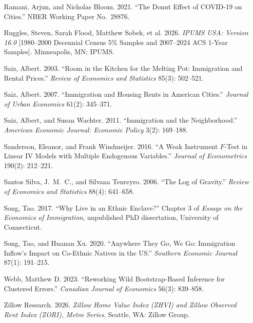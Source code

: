 \documentclass[11pt]{article}
\begin{document}
\begin{list}{}{%
  \setlength{\leftmargin}{1.5em}%
  \setlength{\itemindent}{-1.5em}%
  \setlength{\itemsep}{0.14em}%
  \setlength{\parsep}{0pt}%
}
\item Ramani, Arjun, and Nicholas Bloom. 2021. ``The Donut Effect of COVID-19 on Cities.'' NBER Working Paper No.\ 28876.
\item Ruggles, Steven, Sarah Flood, Matthew Sobek, et al. 2026. \emph{IPUMS USA: Version 16.0} [1980--2000 Decennial Census 5\% Samples and 2007--2024 ACS 1-Year Samples]. Minneapolis, MN: IPUMS.
\item Saiz, Albert. 2003. ``Room in the Kitchen for the Melting Pot: Immigration and Rental Prices.'' \emph{Review of Economics and Statistics} 85(3): 502--521.
\item Saiz, Albert. 2007. ``Immigration and Housing Rents in American Cities.'' \emph{Journal of Urban Economics} 61(2): 345--371.
\item Saiz, Albert, and Susan Wachter. 2011. ``Immigration and the Neighborhood.'' \emph{American Economic Journal: Economic Policy} 3(2): 169--188.
\item Sanderson, Eleanor, and Frank Windmeijer. 2016. ``A Weak Instrument $F$-Test in Linear IV Models with Multiple Endogenous Variables.'' \emph{Journal of Econometrics} 190(2): 212--221.
\item Santos Silva, J.\ M.\ C., and Silvana Tenreyro. 2006. ``The Log of Gravity.'' \emph{Review of Economics and Statistics} 88(4): 641--658.
\item Song, Tao. 2017. ``Why Live in an Ethnic Enclave?'' Chapter 3 of \emph{Essays on the Economics of Immigration}, unpublished PhD dissertation, University of Connecticut.
\item Song, Tao, and Huanan Xu. 2020. ``Anywhere They Go, We Go: Immigration Inflow's Impact on Co-Ethnic Natives in the US.'' \emph{Southern Economic Journal} 87(1): 191--215.
\item Webb, Matthew D. 2023. ``Reworking Wild Bootstrap-Based Inference for Clustered Errors.'' \emph{Canadian Journal of Economics} 56(3): 839--858.
\item Zillow Research. 2026. \emph{Zillow Home Value Index (ZHVI) and Zillow Observed Rent Index (ZORI), Metro Series}. Seattle, WA: Zillow Group.
\end{list}
\end{document}

